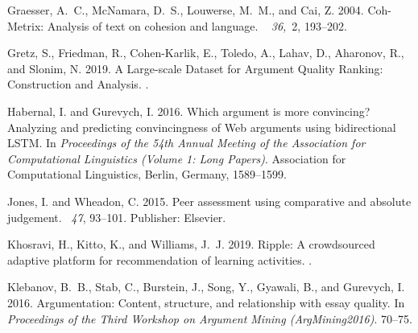 \documentclass[notitlepage,12pt]{jedm}
\begin{document}
\begin{thebibliography}{}
{\sc Graesser, A.~C.}, {\sc McNamara, D.~S.}, {\sc Louwerse, M.~M.}, {\sc and}
  {\sc Cai, Z.} 2004.
\newblock Coh-{Metrix}: {Analysis} of text on cohesion and language.
~{\em
  36,\/}~2, 193--202.

{\sc Gretz, S.}, {\sc Friedman, R.}, {\sc Cohen-Karlik, E.}, {\sc Toledo, A.},
  {\sc Lahav, D.}, {\sc Aharonov, R.}, {\sc and} {\sc Slonim, N.} 2019.
\newblock A {Large}-scale {Dataset} for {Argument} {Quality} {Ranking}:
  {Construction} and {Analysis}.
.

{\sc Habernal, I.} {\sc and} {\sc Gurevych, I.} 2016.
\newblock Which argument is more convincing? {Analyzing} and predicting
  convincingness of {Web} arguments using bidirectional {LSTM}.
\newblock In {\em Proceedings of the 54th {Annual} {Meeting} of the
  {Association} for {Computational} {Linguistics} ({Volume} 1: {Long}
  {Papers})}. Association for Computational Linguistics, Berlin, Germany,
  1589--1599.

{\sc Jones, I.} {\sc and} {\sc Wheadon, C.} 2015.
\newblock Peer assessment using comparative and absolute judgement.
~{\em 47}, 93--101.
\newblock Publisher: Elsevier.

{\sc Khosravi, H.}, {\sc Kitto, K.}, {\sc and} {\sc Williams, J.~J.} 2019.
\newblock Ripple: {A} crowdsourced adaptive platform for recommendation of
  learning activities.
.

{\sc Klebanov, B.~B.}, {\sc Stab, C.}, {\sc Burstein, J.}, {\sc Song, Y.}, {\sc
  Gyawali, B.}, {\sc and} {\sc Gurevych, I.} 2016.
\newblock Argumentation: {Content}, structure, and relationship with essay
  quality.
\newblock In {\em Proceedings of the {Third} {Workshop} on {Argument} {Mining}
  ({ArgMining2016})}. 70--75.


\end{thebibliography}
\end{document}
